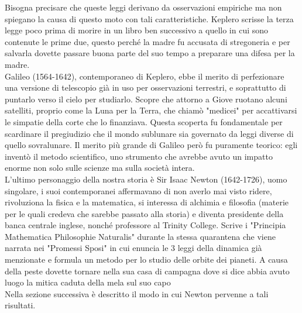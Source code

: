 Bisogna precisare che queste leggi derivano da osservazioni empiriche ma non spiegano la causa di questo moto con tali caratteristiche. Keplero scrisse la terza legge poco prima di morire in un libro ben successivo a quello in cui sono contenute le prime due, questo perché la madre fu accusata di stregoneria e per salvarla dovette passare buona parte del suo tempo a preparare una difesa per la madre.\\
Galileo (1564-1642), contemporaneo di Keplero, ebbe il merito di  perfezionare una versione di telescopio già in uso per osservazioni terrestri, e soprattutto di puntarlo verso il cielo per studiarlo. Scopre che attorno a Giove ruotano alcuni satelliti, proprio come la Luna per la Terra, che chiamò "medicei" per accattivarsi le simpatie della corte che lo finanziava. Questa scoperta fu fondamentale per scardinare il pregiudizio che il mondo sublunare sia governato da leggi diverse di quello sovralunare. Il merito più grande di Galileo però fu puramente teorico: egli inventò il metodo scientifico, uno strumento che avrebbe avuto un impatto enorme non solo sulle scienze ma sulla società intera.\\
L'ultimo personaggio della nostra storia è Sir Isaac Newton (1642-1726), uomo singolare, i suoi contemporanei affermavano di non averlo mai visto ridere, rivoluziona la fisica e la matematica, si interessa di alchimia e filosofia (materie per le quali credeva che sarebbe passato alla storia) e diventa presidente della banca centrale inglese, nonché professore al Trinity College.
Scrive i "Principia Mathematica Philosophie Naturalis" durante la stessa quarantena che viene narrata nei "Promessi Sposi" in cui enuncia le 3 leggi della dinamica già menzionate e formula un metodo per lo studio delle orbite dei pianeti. A causa della peste dovette tornare nella sua casa di campagna dove si dice abbia avuto luogo la mitica caduta della mela sul suo capo\\
Nella sezione successiva è descritto il modo in cui Newton pervenne a tali risultati.
